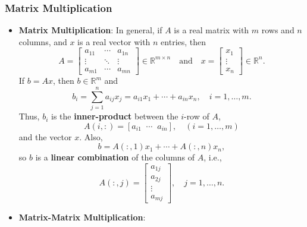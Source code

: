 \documentclass{report}
\begin{document}
    \subsubsection{Matrix Multiplication}
    \bigbreak \noindent 
    \begin{itemize}
        \item \textbf{Matrix Multiplication}:        
            In general, if $A$ is a real matrix with $m$ rows and $n$ columns, and $x$ is a real vector with $n$ entries, then
            \[
                A = 
                \begin{bmatrix}
                    a_{11} & \cdots & a_{1n} \\
                    \vdots & \ddots & \vdots \\
                    a_{m1} & \cdots & a_{mn}
                \end{bmatrix}
                \in \mathbb{R}^{m \times n}
                \quad \text{and} \quad
                x =
                \begin{bmatrix}
                    x_{1} \\
                    \vdots \\
                    x_{n}
                \end{bmatrix}
                \in \mathbb{R}^n.
            \]
            If $b = Ax$, then $b \in \mathbb{R}^m$ and
            \[
                b_i = \sum_{j=1}^n a_{ij} x_j
                = a_{i1}x_1 + \cdots + a_{in}x_n, 
                \quad i = 1, \ldots, m.
            \]
            Thus, $b_i$ is the \textbf{inner-product} between the $i$-row of $A$, 
            \[
                A(i,:) = [a_{i1} \;\; \cdots \;\; a_{in}], \quad (i = 1, \ldots, m)
            \]
            and the vector $x$.
            \bigbreak \noindent 
            Also,
            \[
                b = A(:,1) x_1 + \cdots + A(:,n)x_n,
            \]
            so $b$ is a \textbf{linear combination} of the columns of $A$, i.e.,
            \[
                A(:,j) = 
                \begin{bmatrix}
                    a_{1j} \\
                    a_{2j} \\
                    \vdots \\
                    a_{mj}
                \end{bmatrix},
                \quad j = 1, \ldots, n.
            \]
        \item \textbf{Matrix-Matrix Multiplication}:

\end{itemize}
\end{document}
